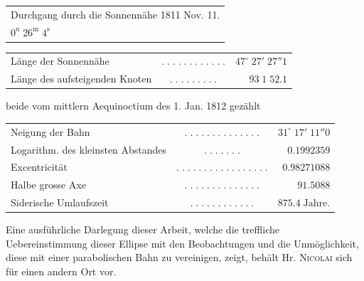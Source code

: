 \medskip
\begin{center}\fontsize{10}{12}\selectfont\setlength{\tabcolsep}{2pt}\renewcommand{\arraystretch}{1.15}\begin{tabular}{l}
Durchgang durch die Sonnennähe 1811 Nov. 11.\\$0^{\mathrm u}\;26^{\mathrm m}\;4^{\mathrm s}$
\end{tabular}\end{center}
\begin{center}\fontsize{9}{11}\selectfont\setlength{\tabcolsep}{2pt}\renewcommand{\arraystretch}{1.15}\begin{tabular}{lcr}
Länge der Sonnennähe & $.\;.\;.\;.\;.\;.\;.\;.\;.\;.\;.\;.$ & $47^\circ\;27'\;27''1$\\
Länge des aufsteigenden Knoten & $.\;.\;.\;.\;.\;.\;.\;.\;.$ & $93\;1\;52.1$\\
\end{tabular}\end{center}
\noindent beide vom mittlern Aequinoctium des 1. Jan. 1812 gezählt
\begin{center}\fontsize{9}{11}\selectfont\setlength{\tabcolsep}{2pt}\renewcommand{\arraystretch}{1.15}\begin{tabular}{lcr}
Neigung der Bahn & $.\;.\;.\;.\;.\;.\;.\;.\;.\;.\;.\;.\;.\;.$ & $31^\circ\;17'\;11''0$\\
Logarithm. des kleinsten Abstandes & $.\;.\;.\;.\;.\;.\;.$ & $0.1992359$\\
Excentricität & $.\;.\;.\;.\;.\;.\;.\;.\;.\;.\;.\;.\;.\;.\;.\;.\;.$ & $0.98271088$\\
Halbe grosse Axe & $.\;.\;.\;.\;.\;.\;.\;.\;.\;.\;.\;.\;.\;.$ & $91.5088$\\
Siderische Umlaufszeit & $.\;.\;.\;.\;.\;.\;.\;.\;.\;.\;.\;.$ & $875.4\;\text{Jahre.}$\\
\end{tabular}\end{center}

\par\indent Eine ausführliche Darlegung dieser Arbeit, welche die treffliche Uebereinstimmung dieser Ellipse mit
den Beobachtungen und die Unmöglichkeit, diese mit einer parabolischen Bahn zu vereinigen, zeigt,
behält Hr. \textsc{Nicolai} sich für einen andern Ort vor.
